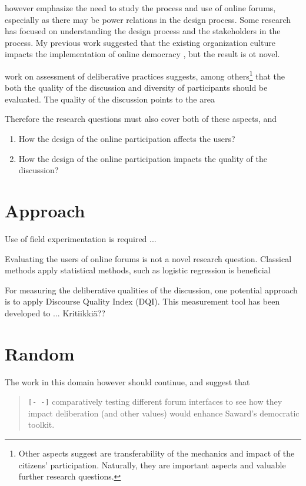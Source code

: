 \documentclass[journal,a4paper]{IEEEtran}
\begin{document}
 however emphasize the need to study the process and use of online forums, especially as there may be power relations in the design process.  Some research has focused on understanding the design process and the stakeholders in the process. My previous work suggested that the existing organization culture impacts the implementation of online democracy \cite{nelimarkka11}, but the result is ot novel. 

 work on assessment of deliberative practices suggests, among others\footnote{Other aspects  suggest are transferability of the mechanics and impact of the citizens' participation. Naturally, they are important aspects and valuable further research questions.} that the both the quality of the discussion and diversity of participants should be evaluated. The quality of the discussion points to the area

Therefore the research questions must also cover both of these aspects, and 

\begin{enumerate}
\item How the design of the online participation affects the users?
\item How the design of the online participation impacts the quality of the discussion?
\end{enumerate}

\section{Approach}

Use of field experimentation is required ...

Evaluating the users of online forums is not a novel research question. Classical methods apply statistical methods, such as logistic regression is beneficial

For measuring the deliberative qualities of the discussion, one potential approach is to apply  Discourse Quality Index (DQI). This measurement tool has been developed to ... Kritiikkiä??

\section{Random}

The work in this domain however should continue, and  suggest that

\begin{quote}
\texttt{[- -]} comparatively testing different forum interfaces to see how they impact deliberation (and other values) would 
enhance Saward’s democratic toolkit.
\end{quote}



\end{document}
